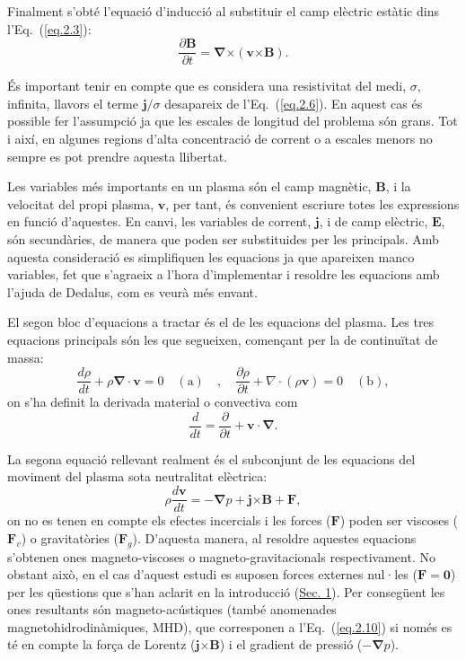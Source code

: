 \documentclass[12pt,a4paper]{article}
\numberwithin{equation}{section}
\begin{document}
Finalment s'obté l'equació d'inducció al substituir el camp elèctric estàtic %
dins l'Eq.~(\ref{eq.2.3}):
\begin{equation}
    \frac{\partial \bm{B}}{\partial t} = \bm{\nabla} \bm{\times} (\bm{v} \bm{\times} \bm{B}). \tag{2.7} \label{eq.2.7}
\end{equation}

És important tenir en compte que es considera una resistivitat del medi, $\sigma$, infinita, llavors el terme $\bm{j}/\sigma$ desapareix de l'Eq.~(\ref{eq.2.6}).
En aquest cas és possible fer l'assumpció ja que les escales de longitud del problema són grans. Tot i així, en algunes regions d'alta concentració de corrent o a escales menors no sempre es pot prendre aquesta llibertat.

Les variables més importants en un plasma són el camp magnètic, $\bm{B}$, i la velocitat del propi plasma, $\bm{v}$, per tant, és convenient escriure totes les expressions en funció d'aquestes.
En canvi, les variables de corrent, $\bm{j}$, i de camp elèctric, $\bm{E}$, són secundàries, de manera que poden ser substituides per les principals.
Amb aquesta consideració es simplifiquen les equacions ja que apareixen manco variables, fet que s'agraeix a l'hora d'implementar i resoldre les equacions amb l'ajuda de Dedalus, com es veurà més envant.



El segon bloc d'equacions a tractar és el de les equacions del plasma. Les tres equacions principals són les que segueixen, començant per la de continuïtat de massa:
\begin{equation}
    \frac{d\rho}{dt} + \rho \bm{\nabla} \cdot \bm{v} = 0 \quad (\text{a}) \quad , \quad \frac{\partial \rho}{\partial t} + \nabla \cdot (\rho \bm{v}) = 0 \quad (\text{b}), \tag{2.8} \label{eq.2.8}
\end{equation}
on s'ha definit la derivada material o convectiva com
\begin{equation}
    \frac{d}{dt} = \frac{\partial}{\partial t} + \bm{v} \cdot \bm{\nabla}. \tag{2.9} \label{eq.2.9}
\end{equation}

La segona equació rellevant realment és el subconjunt de les equacions del moviment del plasma sota neutralitat elèctrica:
\begin{equation}
    \rho \frac{d \bm{v}}{dt} = - \bm{\nabla} p + \bm{j} \bm{\times} \bm{B} + \bm{F}, \tag{2.10} \label{eq.2.10}
\end{equation}
on no es tenen en compte els efectes incercials i les forces ($\bm{F}$) poden ser viscoses ($\bm{F}_{v}$) o gravitatòries ($\bm{F}_g$).
D'aquesta manera, al resoldre aquestes equacions s'obtenen ones magneto-viscoses o magneto-gravitacionals respectivament.
No obstant això, en el cas d'aquest estudi es suposen forces externes nul·les ($\bm{F} = \bm{0}$) per les qüestions que s'han aclarit en la introducció (\hyperref[sec:intro]{Sec. 1}). %
Per consegüent les ones resultants són magneto-acústiques (també anomenades magnetohidrodinàmiques, MHD), que corresponen a l'Eq.~(\ref{eq.2.10}) si només es té en compte la força de Lorentz ($\bm{j} \bm{\times} \bm{B}$) i el gradient de pressió ($- \bm{\nabla} p$).
\end{document}
